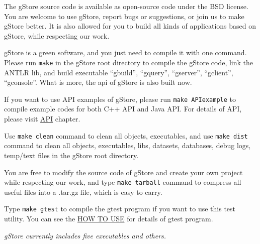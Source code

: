 \documentclass[titlepage, a4paper, 12pt]{article}
\begin{document}

The gStore source code is available as open-source code under the BSD license. You are welcome to use gStore, report bugs or suggestions, or join us to make gStore better. It is also allowed for you to build all kinds of applications based on gStore, while respecting our work.

\clearpage


gStore is a green software, and you just need to compile it with one command. Please run \texttt{make} in the gStore root directory to compile the gStore code, link the ANTLR lib, and build executable ``gbuild'', ``gquery'', ``gserver'', ``gclient'', ``gconsole''. What is more, the api of gStore is also built now.

If you want to use API examples of gStore, please run \texttt{make\ APIexample} to compile example codes for both C++ API and Java API. For details of API, please visit \hyperref[chapter05]{API} chapter.

Use \texttt{make\ clean} command to clean all objects, executables, and use \texttt{make\ dist} command to clean all objects, executables, libs, datasets, databases, debug logs, temp/text files in the gStore root directory.

You are free to modify the source code of gStore and create your own project while respecting our work, and type \texttt{make\ tarball} command to compress all useful files into a .tar.gz file, which is easy to carry.

Type \texttt{make\ gtest} to compile the gtest program if you want to use this test utility. You can see the \hyperref[chapter04]{HOW TO USE} for details of gtest program.

\clearpage


\textit{gStore currently includes five executables and others.}
\end{document}
